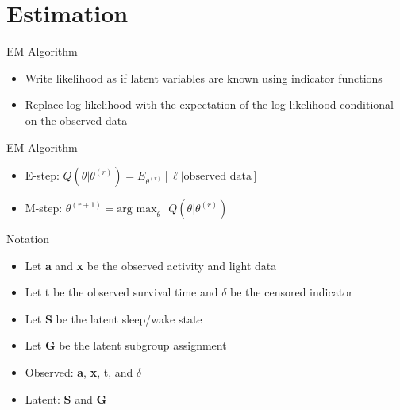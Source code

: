 \documentclass{beamer}
\begin{document}
\section{Estimation} 




\begin{frame}{EM Algorithm}
\begin{itemize}
    \item Write likelihood as if latent variables are known using indicator functions
    \item Replace log likelihood with the expectation of the log likelihood conditional on the observed data
\end{itemize}
\end{frame}

\begin{frame}{EM Algorithm}


\begin{itemize}
    \item E-step: $Q(\theta|\theta^{(r)}) = E_{\theta^{(r)}}[\ell| \text{observed data}]$
    \item M-step: $\theta^{(r+1)} = \text{arg max}_\theta \text{ } Q(\theta|\theta^{(r)}) $
\end{itemize}
\end{frame}


\begin{frame}{Notation}
\begin{itemize}
    \item Let \textbf{a} and \textbf{x} be the observed activity and light data
    \item Let t be the observed survival time and $\delta$ be the censored indicator
    \item Let \textbf{S} be the latent sleep/wake state
    \item Let \textbf{G} be the latent subgroup assignment
    \item Observed: \textbf{a}, \textbf{x}, t, and $\delta$
    \item Latent: \textbf{S} and \textbf{G}
\end{itemize}
\end{frame}
\end{document}
